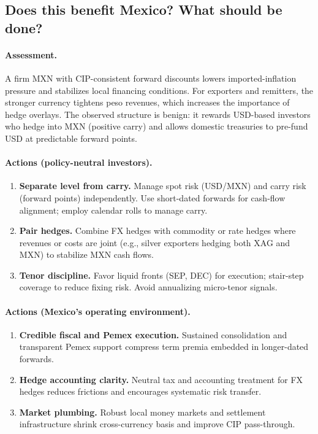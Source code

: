 \documentclass[11pt,a4paper]{article} %
\begin{document}
\subsection{Does this benefit Mexico? What should be done?}
\paragraph{Assessment.}
A firm MXN with CIP-consistent forward discounts lowers imported-inflation pressure and stabilizes local financing conditions. For exporters and remitters, the stronger currency tightens peso revenues, which increases the importance of hedge overlays. The observed structure is benign: it rewards USD-based investors who hedge into MXN (positive carry) and allows domestic treasuries to pre-fund USD at predictable forward points.

\paragraph{Actions (policy-neutral investors).}
\begin{enumerate}
  \item \textbf{Separate level from carry.} Manage spot risk (USD/MXN) and carry risk (forward points) independently. Use short-dated forwards for cash-flow alignment; employ calendar rolls to manage carry.
  \item \textbf{Pair hedges.} Combine FX hedges with commodity or rate hedges where revenues or costs are joint (e.g., silver exporters hedging both XAG and MXN) to stabilize MXN cash flows.
  \item \textbf{Tenor discipline.} Favor liquid fronts (SEP, DEC) for execution; stair-step coverage to reduce fixing risk. Avoid annualizing micro-tenor signals.
\end{enumerate}

\paragraph{Actions (Mexico’s operating environment).}
\begin{enumerate}
  \item \textbf{Credible fiscal and Pemex execution.} Sustained consolidation and transparent Pemex support compress term premia embedded in longer-dated forwards.
  \item \textbf{Hedge accounting clarity.} Neutral tax and accounting treatment for FX hedges reduces frictions and encourages systematic risk transfer.
  \item \textbf{Market plumbing.} Robust local money markets and settlement infrastructure shrink cross-currency basis and improve CIP pass-through.
\end{enumerate}
\end{document}
